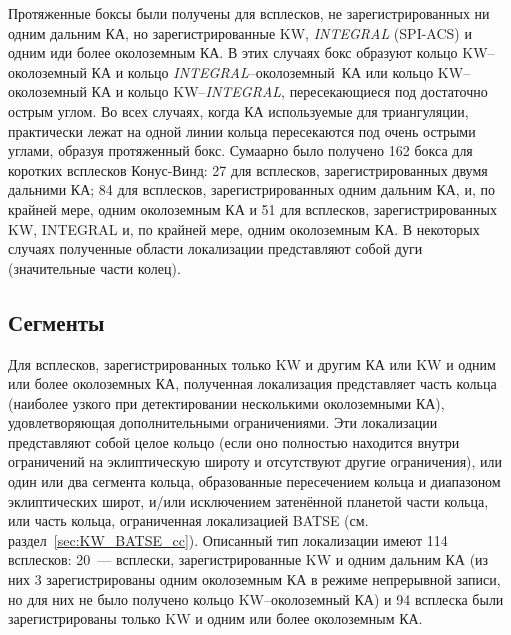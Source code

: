 Протяженные боксы были получены для всплесков, не зарегистрированных ни одним дальним КА, 
но зарегистрированные KW, \textit{INTEGRAL} (SPI-ACS) и одним иди более околоземным КА. 
В этих случаях бокс образуют кольцо KW--околоземный КА и
кольцо \textit{INTEGRAL}--околоземный~КА или кольцо KW--околоземный КА 
и кольцо KW--\textit{INTEGRAL}, пересекающиеся под достаточно острым углом.
Во всех случаях, когда КА используемые для триангуляции, практически лежат на
одной линии кольца пересекаются под очень острыми углами, образуя протяженный бокс.
Сумаарно было получено 162 бокса для коротких всплесков Конус-Винд: 27 для всплесков, 
зарегистрированных двумя дальними КА; 84 для всплесков, зарегистрированных одним 
дальним КА, и, по крайней мере, одним околоземным КА и 51 для всплесков, 
зарегистрированных KW, INTEGRAL и, по крайней мере, одним околоземным КА. В некоторых
случаях полученные области локализации представляют собой дуги (значительные части
колец).

\subsection{Сегменты}
Для всплесков, зарегистрированных только KW и другим КА или KW 
и одним или более околоземных КА, полученная локализация представляет часть кольца 
(наиболее узкого при детектировании несколькими околоземными КА), удовлетворяющая 
дополнительными ограничениями. Эти локализации представляют собой целое кольцо 
(если оно полностью находится внутри ограничений на эклиптическую широту и 
отсутствуют другие ограничения), или один или два сегмента кольца, образованные 
пересечением кольца и диапазоном эклиптических широт, и/или исключением затенённой 
планетой части кольца, или часть кольца, ограниченная локализацией BATSE (см. раздел~\ref{sec:KW_BATSE_cc}).
Описанный тип локализации имеют 114 всплесков: 20~--- всплески, зарегистрированные 
KW и одним дальним КА (из них 3 зарегистрированы одним околоземным КА в режиме 
непрерывной записи, но для них не было получено кольцо KW--околоземный КА) и 94 
всплеска были зарегистрированы только KW и одним или более околоземным КА.

